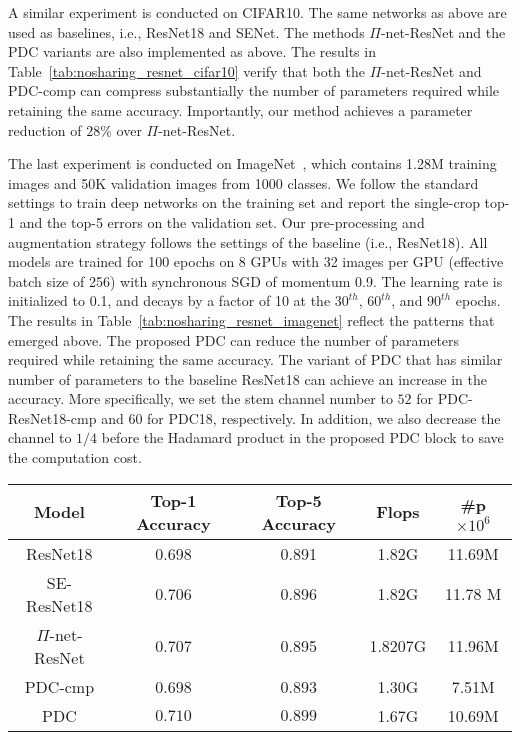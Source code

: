 \documentclass[runningheads]{llncs}
\newcommand{\resnet}{ResNet}
\newcommand{\modelres}{$\Pi$-net-\resnet}
\newcommand{\sne}{SENet}
\newcommand{\noshare}{PDC}
\providecommand\ie{i.e.,}
\begin{document}
A similar experiment is conducted on CIFAR10. 
The same networks as above are used as baselines, \ie{} \resnet18 and \sne{}. The methods \modelres{} and the \noshare{} variants are also implemented as above. The results in Table~\ref{tab:nosharing_resnet_cifar10} verify that both the \modelres{} and \noshare-comp can compress substantially the number of parameters required while retaining the same accuracy. Importantly, our method achieves a  parameter reduction of $28\%$ over \modelres. 

     


The last experiment is conducted on ImageNet~\cite{deng2009imagenet}, which contains 1.28M training images and 50K validation images from 1000 classes. We follow the standard settings to train 
deep networks on the training set and report the single-crop top-1 and the top-5 errors on the validation set. Our pre-processing and augmentation strategy follows the settings of the baseline (i.e., \resnet18). All models are trained for 100 epochs on 8  
GPUs with 32 images per GPU (effective batch size of 256) with synchronous SGD of momentum 0.9. The learning rate is initialized to 0.1, and decays by a factor of 10 at the $30^{th}$, $60^{th}$, and $90^{th}$ epochs. The results in Table~\ref{tab:nosharing_resnet_imagenet} reflect the patterns that emerged above. The proposed \noshare{} can reduce the number of parameters  required while retaining the same accuracy. The variant of \noshare{} that has similar number of parameters to the baseline \resnet18 can achieve an increase in the accuracy. More specifically, we set the stem channel number to $52$ for PDC-ResNet18-cmp and $60$ for \noshare18, respectively. In addition, we also decrease the channel to $1/4$ before the Hadamard product in the proposed PDC block to save the computation cost.


\begin{table*}[h]
\caption{Image classification on ImageNet with variants of \resnet18.}
\centering
    \begin{tabular}{|c | c | c| c | c |}
    \hline
    Model   & Top-1 Accuracy & Top-5 Accuracy & Flops  & \textbf{\#p} $\times 10^6$\\
    \hline
        ResNet18        & 0.698 &  0.891 & 1.82G & 11.69M \\
        SE-ResNet18     & 0.706 &  0.896 & 1.82G  &  11.78 M  \\
        \modelres       & 0.707 &  0.895 &  1.8207G     & 11.96M  \\
        \noshare-cmp    & 0.698 &  0.893 &1.30G & 7.51M \\
        \noshare    & $\bm{0.710}$  &   $\bm{0.899}$  & 1.67G  & 10.69M \\

    \hline
    \end{tabular}
\label{tab:nosharing_resnet_imagenet}
\end{table*}
\end{document}
